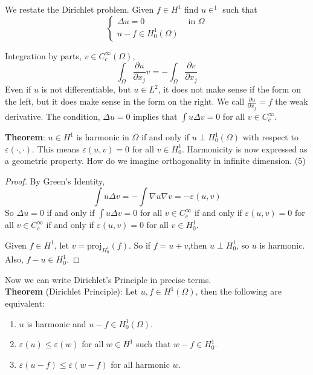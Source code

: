 \documentclass[12pt]{article}
\begin{document}
We restate the Dirichlet problem. Given $f \in H^1$ find $u \in ^1$ such that 
$$\begin{cases} \Delta u = 0 & \text{ in } \Omega \\ u - f \in H_0^1(\Omega)\end{cases}$$

Integration by parts, $v \in C_c^\infty(\Omega)$,
$$\int_\Omega \frac{\partial u}{\partial x_j} v = - \int_\Omega \frac{\partial v}{\partial x_j}$$
Even if $u$ is not differentiable, but $u \in L^2$, it does not make sense if the form on the left, but it does make sense in the form on the right. We call $\frac{\partial u}{\partial x_j} = f$ the weak derivative. The condition, $\Delta u = 0$ implies that $\int u \Delta v = 0$ for all $v \in C_c^\infty$. 

\noindent \textbf{Theorem}: $u \in H^1$ is harmonic in $\Omega$ if and only if $u \perp H_0^1(\Omega)$ with respect to $\varepsilon(\cdot, \cdot)$. This means $\varepsilon(u,v) = 0$ for all $v \in H_0^1$. Harmonicity is now expressed as a geometric property. How do we imagine orthogonality in infinite dimension.  (5)

\begin{proof}
By Green's Identity,
$$\int u \Delta v = - \int \nabla u \nabla v = -\varepsilon(u,v)$$
So $\Delta u = 0$ if and only if $\int u \Delta v = 0$ for all $v \in C_c^\infty$ if and only if $\varepsilon(u,v)=0$ for all $v \in C^\infty_c$ if and only if $\varepsilon(u,v) = 0$ for all $v \in H_0^1$. 

Given $f \in H^1$, let $v = \text{proj}_{H_0^1}(f)$. So if $f= u+v$,then $u \perp H_0^1$, so $u$ is harmonic. Also, $f-u \in H_0^1$.
\end{proof}

Now we can write Dirichlet's Principle in precise terms. \\

\noindent \textbf{Theorem} (Dirichlet Principle): Let $u,f \in H^1(\Omega)$, then the following are equivalent:
\begin{enumerate}
\item $u$ is harmonic and $u-f \in H_0^1(\Omega)$.
\item $\varepsilon(u) \leq \varepsilon(w)$ for all $w \in H^1$ such that $w-f \in H_0^1$. 
\item $\varepsilon(u-f) \leq \varepsilon(w-f)$ for all harmonic $w$.
\end{enumerate}
\end{document}
